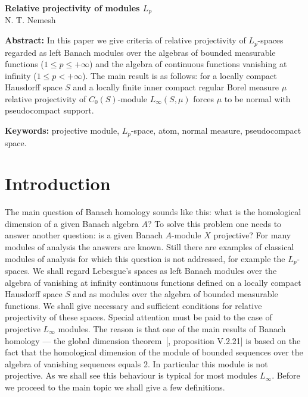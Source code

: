 \documentclass[12pt]{article}
\begin{document}
\begin{center}
    \Large \textbf{Relative projectivity of modules $L_p$}\\[0.5cm]
    \small {N. T. Nemesh}\\[0.5cm]
\end{center}

\thispagestyle{empty}

\medskip
\textbf{Abstract:} In this paper we give criteria of relative projectivity of
$L_p$-spaces regarded as left Banach modules over the algebras of bounded
measurable functions ($1\leq p\leq +\infty$) and the algebra of continuous
functions vanishing at infinity ($1\leq p< +\infty$). The main result is as
follows: for a locally compact Hausdorff space $S$ and a locally finite inner
compact regular Borel measure $\mu$ relative projectivity of $C_0(S)$-module
$L_\infty(S,\mu)$ forces $\mu$ to be normal with pseudocompact support.
\medskip

\textbf{Keywords:} projective module, $L_p$-space, atom, normal measure,
pseudocompact space.

\bigskip


\section{Introduction}\label{SectionIntroduction}

The main question of Banach homology sounds like this: what is the homological
dimension of a given Banach algebra $A$? To solve this problem one needs to
answer another question: is a given Banach $A$-module $X$ projective? For many
modules of analysis the answers are known. Still there are examples of classical
modules of analysis for which this question is not addressed, for example the
$L_p$-spaces. We shall regard Lebesgue's spaces as left Banach modules over the
algebra of vanishing at infinity continuous functions defined on a locally
compact Hausdorff space $S$ and as modules over the algebra of bounded
measurable functions. We shall give necessary and sufficient conditions for
relative projectivity of these spaces. Special attention must be paid to the
case of projective $L_\infty$ modules. The reason is that one of the main
results of Banach homology --- the global dimension
theorem~[\cite{HelHomolBanTopAlg}, proposition V.2.21] is based on the fact that
the homological dimension of the module of bounded sequences over the algebra of
vanishing sequences equals 2. In particular this module is not projective. As we
shall see this behaviour is typical for most modules $L_\infty$. Before we
proceed to the main topic we shall give a few definitions.
\end{document}
